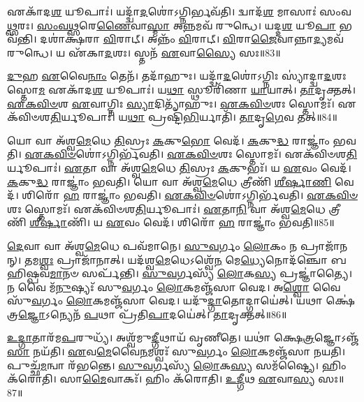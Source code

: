 𑌏𑌕𑌾᳴𑌦\-\ul{𑌶} 𑌯𑍂𑌪𑌾𑌃॑।
𑌯𑌦𑍍𑌦𑍍𑌵𑌾᳴\-\ul{𑌦}\-𑌶𑍋॑\-𑌽𑌗𑍍𑌨𑌿𑌰𑍍𑌭𑌵᳴𑌤𑌿।
𑌦𑍍𑌵𑌾𑌦᳴\-\ul{𑌶} 𑌮𑌾𑌸𑌾𑌃॑ 𑌸𑌂𑌵\-\ul{𑌥𑍍𑌸}\-𑌰𑌃।
\-\ul{𑌸𑌂}\-\-\ul{𑌵}\-\-\ul{𑌥𑍍𑌸}\-𑌰𑍇\-\ul{𑌣𑍈}\-𑌵𑌾\-\ul{𑌸𑍍𑌮𑌾} 𑌅\-\ul{𑌨𑍍𑌨}\-𑌮𑌵᳴ 𑌰𑍁𑌨𑍍𑌧𑍇।
𑌯𑌦𑍍𑌦\-\ul{𑌶} 𑌯𑍂\-\ul{𑌪𑌾} 𑌭𑌵᳴𑌨𑍍𑌤𑌿।
𑌦𑌶𑌾॑𑌕𑍍𑌷𑌰𑌾 \ul{𑌵𑌿}\-𑌰𑌾𑌟𑍍।
𑌅𑌨𑍍𑌨𑌂᳴ \ul{𑌵𑌿}\-𑌰𑌾𑌟𑍍।
\-\ul{𑌵𑌿}\-𑌰𑌾\-\ul{𑌜𑍈}\-𑌵𑌾𑌨𑍍𑌨𑌾\-\ul{𑌦𑍍𑌯}\-𑌮𑌵᳴ 𑌰𑍁𑌨𑍍𑌧𑍇।
𑌯 𑌏᳴𑌕𑌾\-\ul{𑌦}\-𑌶𑌃।
𑌸𑍍𑌤𑌨᳴ \ul{𑌏}\-𑌵𑌾\-\ul{𑌸𑍍𑌯𑍈} 𑌸𑌃॥83॥

\-\ul{𑌦𑍁}\-𑌹 \ul{𑌏}\-𑌵𑍈\-\ul{𑌨𑌾𑌂} 𑌤𑍇𑌨᳴।
𑌤𑌦𑌾᳴𑌹𑍁𑌃।
𑌯𑌦𑍍𑌦𑍍𑌵𑌾᳴\-\ul{𑌦}\-𑌶𑍋॑\-𑌽𑌗𑍍𑌨𑌿𑌃 𑌸𑍍𑌯𑌾॑𑌦𑍍𑌦𑍍𑌵𑌾\-\ul{𑌦}\-𑌶𑌃 𑌸𑍍𑌤𑍋\-\ul{𑌮} 𑌏𑌕𑌾᳴𑌦\-\ul{𑌶} 𑌯𑍂𑌪𑌾𑌃॑।
𑌯\-\ul{𑌥𑌾} 𑌸𑍍𑌥𑍂𑌰𑌿᳴𑌣𑌾 \ul{𑌯𑌾}\-𑌯𑌾𑌤𑍍।
\-\ul{𑌤𑌾}\-𑌦𑍃𑌕𑍍𑌤𑌤𑍍।
\-\ul{𑌏}\-\-\ul{𑌕}\-\-\ul{𑌵𑌿}\-\-\ul{𑍞}\-𑌶 \ul{𑌏}\-𑌵𑌾𑌗𑍍𑌨𑌿𑌃 \ul{𑌸𑍍𑌯𑌾}\-𑌦𑌿𑌤𑍍𑌯𑌾᳴𑌹𑍁𑌃।
\-\ul{𑌏}\-\-\ul{𑌕}\-\-\ul{𑌵𑌿}\-\-\ul{𑍞}\-𑌶𑌃 𑌸𑍍𑌤𑍋𑌮𑌃᳴।
𑌏𑌕᳴𑌵𑌿𑍞𑌶\-\ul{𑌤𑌿}\-𑌰𑍍𑌯𑍂𑌪𑌾𑌃॑।
𑌯\-\ul{𑌥𑌾} 𑌪𑍍𑌰𑌷𑍍𑌟𑌿᳴\-\ul{𑌭𑌿}\-𑌰𑍍𑌯𑌾𑌤𑌿᳴।
\-\ul{𑌤𑌾}\-𑌦𑍃\-\ul{𑌗𑍇}\-𑌵 𑌤𑌤𑍍॥84॥

𑌯𑍋 𑌵𑌾 𑌅᳴𑌶𑍍𑌵\-\ul{𑌮𑍇}\-𑌧𑍇 \ul{𑌤𑌿}\-𑌸𑍍𑌰𑌃 \ul{𑌕}\-𑌕𑍁\-\ul{𑌭𑍋} 𑌵𑍇𑌦᳴।
\-\ul{𑌕}\-𑌕𑍁\-\ul{𑌦𑍍𑌧} 𑌰𑌾𑌜𑍍𑌞𑌾𑌂॑ 𑌭𑌵𑌤𑌿।
\-\ul{𑌏}\-\-\ul{𑌕}\-\-\ul{𑌵𑌿}\-\-\ul{𑍞}\-𑌶𑍋॑\-𑌽𑌗𑍍𑌨𑌿𑌰𑍍𑌭᳴𑌵𑌤𑌿।
\-\ul{𑌏}\-\-\ul{𑌕}\-\-\ul{𑌵𑌿}\-\-\ul{𑍞}\-𑌶𑌃 𑌸𑍍𑌤𑍋𑌮𑌃᳴।
𑌏𑌕᳴𑌵𑌿𑍞𑌶\-\ul{𑌤𑌿}\-𑌰𑍍𑌯𑍂𑌪𑌾𑌃॑।
\-\ul{𑌏}\-𑌤𑌾 𑌵𑌾 𑌅᳴𑌶𑍍𑌵\-\ul{𑌮𑍇}\-𑌧𑍇 \ul{𑌤𑌿}\-𑌸𑍍𑌰𑌃 \ul{𑌕}\-𑌕𑍁𑌭𑌃᳴।
𑌯 \ul{𑌏}\-𑌵𑌂 𑌵𑍇𑌦᳴।
\-\ul{𑌕}\-𑌕𑍁\-\ul{𑌦𑍍𑌧} 𑌰𑌾𑌜𑍍𑌞𑌾𑌂॑ 𑌭𑌵𑌤𑌿।
𑌯𑍋 𑌵𑌾 𑌅᳴𑌶𑍍𑌵\-\ul{𑌮𑍇}\-𑌧𑍇 𑌤𑍍𑌰𑍀𑌣𑌿᳴ \ul{𑌶𑍀}\-\-\ul{𑌰𑍍}\-𑌷𑌾\-\ul{𑌣𑌿} 𑌵𑍇𑌦᳴।
𑌶𑌿𑌰𑍋᳴ \ul{𑌹} 𑌰𑌾𑌜𑍍𑌞𑌾𑌂॑ 𑌭𑌵𑌤𑌿।
\-\ul{𑌏}\-\-\ul{𑌕}\-\-\ul{𑌵𑌿}\-\-\ul{𑍞}\-𑌶𑍋॑\-𑌽𑌗𑍍𑌨𑌿𑌰𑍍𑌭᳴𑌵𑌤𑌿।
\-\ul{𑌏}\-\-\ul{𑌕}\-\-\ul{𑌵𑌿}\-\-\ul{𑍞}\-𑌶𑌃 𑌸𑍍𑌤𑍋𑌮𑌃᳴।
𑌏𑌕᳴𑌵𑌿𑍞𑌶\-\ul{𑌤𑌿}\-𑌰𑍍𑌯𑍂𑌪𑌾𑌃॑।
\-\ul{𑌏}\-𑌤𑌾\-\ul{𑌨𑌿} 𑌵𑌾 𑌅᳴𑌶𑍍𑌵\-\ul{𑌮𑍇}\-𑌧𑍇 𑌤𑍍𑌰𑍀𑌣𑌿᳴ \ul{𑌶𑍀}\-\-\ul{𑌰𑍍}\-𑌷𑌾𑌣𑌿᳴।
𑌯 \ul{𑌏}\-𑌵𑌂 𑌵𑍇𑌦᳴।
𑌶𑌿𑌰𑍋᳴ \ul{𑌹} 𑌰𑌾𑌜𑍍𑌞𑌾𑌂॑ 𑌭𑌵𑌤𑌿॥85॥\anuvakamend[\-\ul{𑌦𑍍𑌵𑌾}\-\-\ul{𑌦}\-𑌶𑌃 𑌸𑍍𑌤𑍋\-\ul{𑌮𑌃} 𑌸 \ul{𑌏}\-𑌵 𑌤𑌚𑍍𑌛𑌿𑌰𑍋᳴ \ul{𑌹} 𑌰𑌾𑌜𑍍𑌞𑌾𑌂॑ 𑌭𑌵\-\ul{𑌤𑌿} 𑌷𑌟𑍍 𑌚᳴]

\-\ul{𑌦𑍇}\-𑌵𑌾 𑌵𑌾 𑌅᳴𑌶𑍍𑌵\-\ul{𑌮𑍇}\-𑌧𑍇 𑌪𑌵᳴𑌮𑌾𑌨𑍇।
\-\ul{𑌸𑍁}\-\-\ul{𑌵}\-𑌰𑍍𑌗𑌂 \ul{𑌲𑍋}\-𑌕𑌂 𑌨 𑌪𑍍𑌰𑌾𑌜𑌾᳴𑌨𑌨𑍍।
𑌤𑌮\-\ul{𑌶𑍍𑌵𑌃} 𑌪𑍍𑌰𑌾𑌜𑌾᳴𑌨𑌾𑌤𑍍।
𑌯𑌦᳴𑌶𑍍𑌵\-\ul{𑌮𑍇}\-𑌧𑍇\-𑌽𑌶𑍍𑌵𑍇᳴\-\ul{𑌨} 𑌮𑍇\-\ul{𑌧𑍍𑌯𑍇}\-𑌨𑍋𑌦᳴𑌞𑍍𑌚𑍋 𑌬𑌹𑌿𑌷𑍍𑌪𑌵\-\ul{𑌮𑌾}\-𑌨𑍞 𑌸𑌰𑍍𑌪᳴𑌨𑍍𑌤𑌿।
\-\ul{𑌸𑍁}\-\-\ul{𑌵}\-𑌰𑍍𑌗𑌸𑍍𑌯᳴ \ul{𑌲𑍋}\-𑌕\-\ul{𑌸𑍍𑌯} 𑌪𑍍𑌰𑌜𑍍𑌞𑌾॑𑌤𑍍𑌯𑍈।
𑌨 𑌵𑍈 𑌮᳴\-\ul{𑌨𑍁}\-𑌷𑍍𑌯𑌃᳴ 𑌸𑍁\-\ul{𑌵}\-𑌰𑍍𑌗𑌂 \ul{𑌲𑍋}\-𑌕𑌮𑌞𑍍𑌜᳴𑌸𑌾 𑌵𑍇𑌦।
𑌅\-\ul{𑌶𑍍𑌵𑍋} 𑌵𑍈 𑌸𑍁᳴\-\ul{𑌵}\-𑌰𑍍𑌗𑌂 \ul{𑌲𑍋}\-𑌕𑌮𑌞𑍍𑌜᳴𑌸𑌾 𑌵𑍇𑌦।
𑌯𑌦𑍁᳴\-\ul{𑌦𑍍𑌗𑌾}\-𑌤𑍋𑌦𑍍𑌗𑌾𑌯𑍇॑𑌤𑍍।
𑌯𑌥𑌾 𑌕𑍍𑌷𑍇॑𑌤𑍍𑌰\-\ul{𑌜𑍍𑌞𑍋}\-\-𑌽𑌨𑍍𑌯𑍇𑌨᳴ \ul{𑌪}\-𑌥𑌾 𑌪𑍍𑌰᳴𑌤𑌿\-\ul{𑌪𑌾}\-𑌦𑌯𑍇॑𑌤𑍍।
\-\ul{𑌤𑌾}\-𑌦𑍃𑌕𑍍𑌤𑌤𑍍॥86॥

\-\ul{𑌉}\-\-\ul{𑌦𑍍𑌗𑌾}\-𑌤𑌾𑌰᳴𑌮\-\ul{𑌪}\-𑌰𑍁𑌧𑍍𑌯᳴।
𑌅𑌶𑍍𑌵᳴𑌮𑍁\-\ul{𑌦𑍍𑌗𑍀}\-𑌥𑌾𑌯᳴ 𑌵𑍃𑌣𑍀𑌤𑍇।
𑌯𑌥𑌾॑ 𑌕𑍍𑌷𑍇\-\ul{𑌤𑍍𑌰}\-𑌜𑍍𑌞𑍋\-𑌽𑌞𑍍𑌜᳴\-\ul{𑌸𑌾} 𑌨𑌯᳴𑌤𑌿।
\-\ul{𑌏}\-𑌵\-\ul{𑌮𑍇}\-𑌵𑍈\-\ul{𑌨}\-𑌮𑌶𑍍𑌵𑌃᳴ 𑌸𑍁\-\ul{𑌵}\-𑌰𑍍𑌗𑌂 \ul{𑌲𑍋}\-𑌕𑌮𑌞𑍍𑌜᳴𑌸𑌾 𑌨𑌯𑌤𑌿।
𑌪𑍁𑌚𑍍𑌛᳴\-\ul{𑌮}\-𑌨𑍍𑌵𑌾 𑌰᳴𑌭𑌨𑍍𑌤𑍇।
\-\ul{𑌸𑍁}\-\-\ul{𑌵}\-𑌰𑍍𑌗𑌸𑍍𑌯᳴ \ul{𑌲𑍋}\-𑌕\-\ul{𑌸𑍍𑌯} 𑌸𑌮᳴𑌷𑍍𑌟𑍍𑌯𑍈।
𑌹𑌿𑌂 𑌕᳴𑌰𑍋𑌤𑌿।
𑌸𑌾\-\ul{𑌮𑍈}\-𑌵𑌾𑌕𑌃᳴।
𑌹𑌿𑌂 𑌕᳴𑌰𑍋𑌤𑌿।
\-\ul{𑌉}\-\-\ul{𑌦𑍍𑌗𑍀}\-𑌥 \ul{𑌏}\-𑌵𑌾\-\ul{𑌸𑍍𑌯} 𑌸𑌃॥87॥

